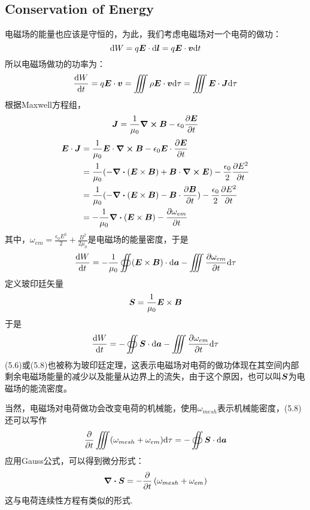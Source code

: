 \documentclass[14pt,oneside]{book}
\begin{document}
\begin{large}
\section{Conservation of Energy}
电磁场的能量也应该是守恒的，为此，我们考虑电磁场对一个电荷的做功：
\begin{equation}
  \dd W =q\vb*{E}\cdot \dd \vb*{l}=q\vb*{E}\cdot \vb*{v}\dd t
\end{equation}
所以电磁场做功的功率为：
\begin{equation}
  \dv{W}{t}=q \vb*{E}\cdot\vb*{v}=\iiint \rho \vb*{E}\cdot\vb*{v}\dd \tau=\iiint \vb*{E}\cdot\vb*{J}\dd \tau
\end{equation}
根据Maxwell方程组，
\begin{equation}
\vb*{J}= \frac{1}{\mu_0} \curl{\vb*{B}}-\epsilon_0\pdv{\vb*{E}}{t}
\end{equation}
\begin{equation}
\begin{aligned}
	  \vb*{E}\cdot \vb*{J}&=\frac{1}{\mu_0}\vb*{E}\cdot\curl{\vb*{B}}-\epsilon_0\vb*{E}\cdot\pdv{\vb*{E}}{t}\\
	  &=\frac{1}{\mu_0}(-\div{(\vb*{E}\times \vb*{B})}+\vb*{B}\cdot\curl{\vb*{E}})-\frac{\epsilon_0}{2}\pdv{E^2}{t}\\
	  &=\frac{1}{\mu_0}(-\div{(\vb*{E}\times \vb*{B})}-\vb*{B}\cdot\pdv{\vb*{B}}{t})-\frac{\epsilon_0}{2}\pdv{E^2}{t}\\
	  &=-\frac{1}{\mu_0}\div{(\vb*{E}\times \vb*{B})}-\pdv{\omega_{em}}{t}
\end{aligned}
\end{equation}
其中，$\omega_{em}=\frac{\epsilon_0 E^2}{2}+\frac{B^2}{2\mu_0}$是电磁场的能量密度，于是
\begin{equation}
  \dv{W}{t}=-\frac{1}{\mu_0}\oiint (\vb*{E}\times \vb*{B})\cdot\dd \vb*{a}-\iiint \pdv{\omega_{em}}{t}\dd \tau
\end{equation}
定义玻印廷矢量
\begin{equation}
  \vb*{S}=\frac{1}{\mu_0}\vb*{E}\times \vb*{B}
\end{equation}
于是
\begin{equation}
    \dv{W}{t}=-\oiint \vb*{S}\cdot\dd \vb*{a}-\iiint \pdv{\omega_{em}}{t}\dd \tau
\end{equation}
(5.6)或(5.8)也被称为玻印廷定理，这表示电磁场对电荷的做功体现在其空间内部剩余电磁场能量的减少以及能量从边界上的流失，由于这个原因，也可以叫$\vb*{S}$为电磁场的能流密度。

当然，电磁场对电荷做功会改变电荷的机械能，使用$\omega_{mesh}$表示机械能密度，(5.8)还可以写作
\begin{equation}
  \pdv{}{t}\iiint (\omega_{mesh}+\omega_{em}) \dd \tau=-\oiint \vb*{S}\cdot\dd \vb*{a}
\end{equation}
应用Gauss公式，可以得到微分形式：
\begin{equation}
  \div{\vb*{S}}=-\pdv{}{t} \left(\omega_{mesh}+\omega_{em}\right)
\end{equation}
这与电荷连续性方程有类似的形式.

\end{large}
\end{document}
